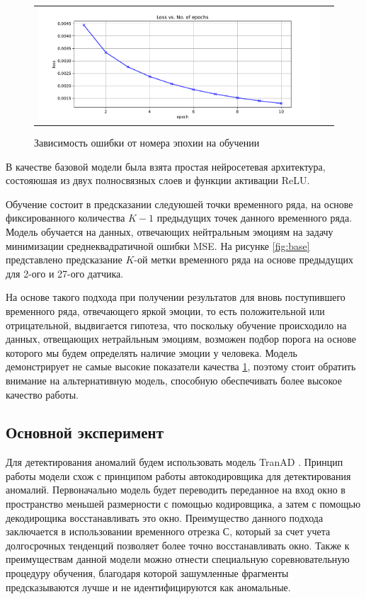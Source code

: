\documentclass{article}
\begin{document}
\begin{figure}[h]
\begin{tabular}{cc}
  \includegraphics[width=160mm]{6.pdf} 
\end{tabular}
\caption{Зависимость ошибки от номера эпохии на обучении}
\label{fig:base_mse}
\end{figure}

В качестве базовой модели была взята простая нейросетевая архитектура, состояюшая из двух полносвязных слоев и функции активации ReLU. 

Обучение состоит в предсказании следуюшей точки временного ряда, на основе фиксированного количества $K - 1$ предыдущих точек данного временного ряда. Модель обучается на данных, отвечающих нейтральным эмоциям на задачу минимизации среднеквадратичной ошибки MSE. На рисунке \ref{fig:base} представлено предсказание $K$-ой метки временного ряда на основе предыдущих для 2-ого и 27-ого датчика.

На основе такого подхода при получении результатов для вновь поступившего временного ряда, отвечающего яркой эмоции, то есть положительной или отрицательной, выдвигается гипотеза, что поскольку обучение происходило на данных, отвещающих нетрайльным эмоциям, возможен подбор порога на основе которого мы будем определять наличие эмоции у человека. Модель демонстрирует не самые высокие показатели качества \ref{fig:base_mse}, поэтому стоит обратить внимание на альтернативную модель, способную обеспечивать более высокое качество работы.




\subsection{Основной эксперимент}

Для детектирования аномалий будем использовать модель TranAD \cite{TranAD}. Принцип работы модели схож с принципом работы автокодировщика для детектирования аномалий. Первоначально модель будет переводить переданное на вход окно в пространство меньшей размерности с помощью кодировщика, а затем с помощью декодирощика восстанавливать это окно. Преимущество данного подхода заключается в использовании временного отрезка $С$, который за счет учета долгосрочных тенденций позволяет более точно восстанавливать окно. Также к преимуществам данной модели можно отнести специальную соревновательную процедуру обучения, благодаря которой зашумленные фрагменты предсказываются лучше и не идентифицируются как аномальные.
\end{document}
